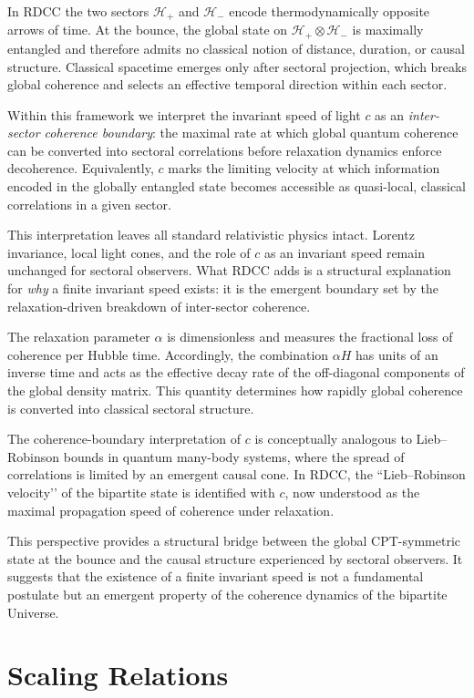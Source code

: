 \documentclass[11pt,a4paper]{article}
\begin{document}
In RDCC the two sectors $\mathcal{H}_{+}$ and $\mathcal{H}_{-}$ encode thermodynamically
opposite arrows of time. At the bounce, the global state on
$\mathcal{H}_{+}\!\otimes\!\mathcal{H}_{-}$ is maximally entangled and therefore admits no
classical notion of distance, duration, or causal structure. Classical spacetime emerges only
after sectoral projection, which breaks global coherence and selects an effective temporal
direction within each sector.

Within this framework we interpret the invariant speed of light $c$ as an
\emph{inter-sector coherence boundary}: the maximal rate at which global quantum coherence
can be converted into sectoral correlations before relaxation dynamics enforce decoherence.
Equivalently, $c$ marks the limiting velocity at which information encoded in the globally
entangled state becomes accessible as quasi-local, classical correlations in a given sector.

This interpretation leaves all standard relativistic physics intact. Lorentz invariance,
local light cones, and the role of $c$ as an invariant speed remain unchanged for sectoral
observers. What RDCC adds is a structural explanation for \emph{why} a finite invariant speed
exists: it is the emergent boundary set by the relaxation-driven breakdown of inter-sector
coherence.

The relaxation parameter $\alpha$ is dimensionless and measures the fractional loss of
coherence per Hubble time. Accordingly, the combination $\alpha H$ has units of an inverse
time and acts as the effective decay rate of the off-diagonal components of the global density
matrix. This quantity determines how rapidly global coherence is converted into classical
sectoral structure.

The coherence-boundary interpretation of $c$ is conceptually analogous to Lieb–Robinson
bounds in quantum many-body systems, where the spread of correlations is limited by an
emergent causal cone. In RDCC, the “Lieb–Robinson velocity’’ of the bipartite state is
identified with $c$, now understood as the maximal propagation speed of coherence under
relaxation.

This perspective provides a structural bridge between the global CPT-symmetric state at
the bounce and the causal structure experienced by sectoral observers. It suggests that the
existence of a finite invariant speed is not a fundamental postulate but an emergent property
of the coherence dynamics of the bipartite Universe.

\section{Scaling Relations}
\end{document}
